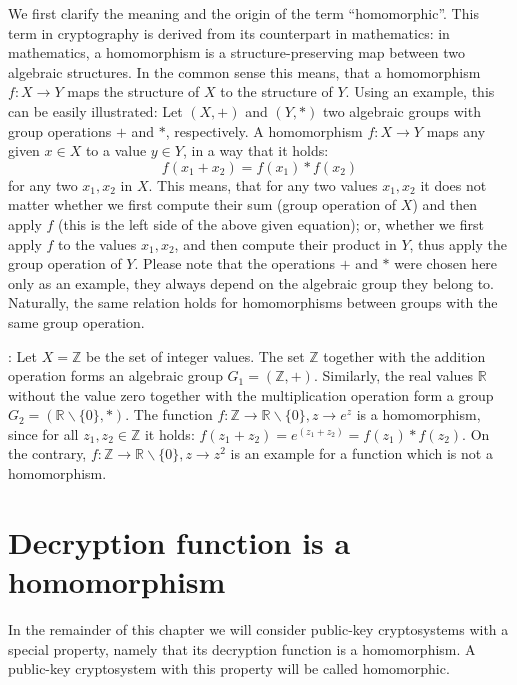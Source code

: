\begin{bibunit}[babalpha]
We first clarify the meaning and the origin of the term ``homomorphic''. This term in cryptography is derived from its counterpart in mathematics: in mathematics, a homomorphism is a structure-preserving map between two algebraic structures. In the common sense this means, that a homomorphism $f: X \to Y$ maps the structure of $X$ to the structure of $Y$. Using an example, this can be easily illustrated: Let $(X,+)$ and $(Y,*)$ two algebraic groups with group operations $+$ and $*$, respectively. A homomorphism $f: X \to Y$ maps any given $x \in X$ to a value $y \in Y$, in a way that it holds:
%
$$f(x_1 + x_2) = f(x_1) * f(x_2)$$
%
for any two $x_1, x_2$ in $X$. This means, that for any two values $x_1, x_2$ it does not matter whether we first compute their sum (group operation of $X$) and then apply $f$ (this is the left side of the above given equation); or, whether we first apply $f$ to the values $x_1, x_2$, and then compute their product in $Y$, thus apply the group operation of $Y$. Please note that the operations $+$ and $*$ were chosen here only as an example, they always depend on the algebraic group they belong to. Naturally, the same relation holds for homomorphisms between groups with the same group operation.

\begin{example}{:} Let $X = \mathbb{Z}$ be the set of integer values. The set $\mathbb{Z}$ together with the addition operation forms an algebraic group $G_1 = (\mathbb{Z}, +)$. Similarly, the real values $\mathbb{R}$ without the value zero together with the multiplication operation form a group $G_2 = (\mathbb{R}\backslash\{0\}, *)$. The function $f:\mathbb{Z}{\to}\mathbb{R}\backslash\{0\},z {\to}e^z$ is a homomorphism, since for all $z_1,z_2 \in \mathbb{Z}$ it holds: $f(z_1+ z_2) = e^{(z_1+ z_2 )} = f(z_1 )* f(z_2)$. On the contrary, $f:\mathbb{Z} \to \mathbb{R}\backslash\{0\}, z \to z^2$ is an example for a function which is not a homomorphism.
\end{example}

\section{Decryption function is a homomorphism}

In the remainder of this chapter we will consider public-key cryptosystems with a special property, namely that its decryption function is a homomorphism. A public-key cryptosystem with this property will be called homomorphic.


\end{bibunit}
